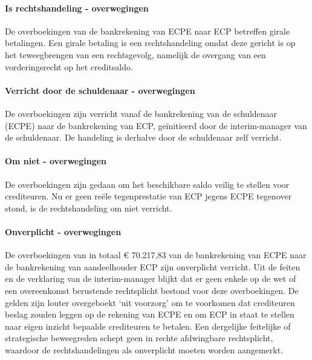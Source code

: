 \documentclass[
  dutch,
  a4paper,
]{article}
\begin{document}
\paragraph{Is rechtshandeling - overwegingen}\label{is-rechtshandeling---overwegingen-47}

De overboekingen van de bankrekening van ECPE naar ECP betreffen girale betalingen. Een girale betaling is een rechtshandeling omdat deze gericht is op het teweegbrengen van een rechtsgevolg, namelijk de overgang van een vorderingsrecht op het creditsaldo.

\paragraph{Verricht door de schuldenaar - overwegingen}\label{verricht-door-de-schuldenaar---overwegingen-47}

De overboekingen zijn verricht vanaf de bankrekening van de schuldenaar (ECPE) naar de bankrekening van ECP, geïnitieerd door de interim-manager van de schuldenaar. De handeling is derhalve door de schuldenaar zelf verricht.

\paragraph{Om niet - overwegingen}\label{om-niet---overwegingen-47}

De overboekingen zijn gedaan om het beschikbare saldo veilig te stellen voor crediteuren. Nu er geen reële tegenprestatie van ECP jegens ECPE tegenover stond, is de rechtshandeling om niet verricht.

\paragraph{Onverplicht - overwegingen}\label{onverplicht---overwegingen-47}

De overboekingen van in totaal € 70.217,83 van de bankrekening van ECPE naar de bankrekening van aandeelhouder ECP zijn onverplicht verricht. Uit de feiten en de verklaring van de interim-manager blijkt dat er geen enkele op de wet of een overeenkomst berustende rechtsplicht bestond voor deze overboekingen. De gelden zijn louter overgeboekt `uit voorzorg' om te voorkomen dat crediteuren beslag zouden leggen op de rekening van ECPE en om ECP in staat te stellen naar eigen inzicht bepaalde crediteuren te betalen. Een dergelijke feitelijke of strategische beweegreden schept geen in rechte afdwingbare rechtsplicht, waardoor de rechtshandelingen als onverplicht moeten worden aangemerkt.
\end{document}
